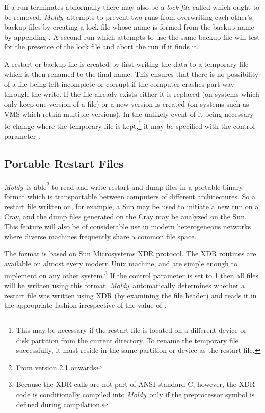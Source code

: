 \documentclass[a4paper,twoside]{report}
\newcommand{\moldy}{\emph{Moldy}}
\begin{document}
If a run terminates abnormally there may also be a \emph{lock file}
called  which ought to be removed.  \moldy\
attempts to prevent two runs from overwriting each other's backup
files by creating a lock file whose name is formed from the backup
name by appending \Fname{.lck}.  A second run which attempts to use the
same backup file will test for the presence of the lock file and abort
the run if it finds it.

A restart or backup file is created by first writing the data to a
temporary file which is then renamed to the final name.  This ensures
that there is no possibility of a file being left incomplete or
corrupt if the computer crashes part-way through the write.  If the
file already exists either it is replaced (on systems which only keep
one version of a file) or a new version is created (on systems such as
VMS which retain multiple versions).  In the unlikely event of it
being necessary to change where the temporary file is
kept,\footnote{This may be necessary if the restart file is located on
  a different device or disk partition from the current directory. To
  rename the temporary file successfully, it must reside in the same
  partition or device as the restart file.} it may be specified with
the control parameter \Lit{temp-file}.

\subsection{Portable Restart Files}
\label{sec:xdr}
\moldy\ is able\footnote{From version 2.1 onwards} to read and write
restart and dump files in a portable binary format which is
transportable between computers of different architectures.  So a
restart file written on, for example, a Sun may be used to initiate a
new run on a Cray, and the dump files generated on the Cray may be
analyzed on the Sun.  This feature will also be of considerable use in
modern heterogeneous networks where diverse machines frequently share
a common file space.

The format is based on Sun Microsystems XDR protocol\cite{sunxdr}.
The XDR routines are available on almost every modern Unix machine,
and are simple enough to implement on any other
system.\footnote{Because the XDR calls are not part of ANSI standard
  C, however, the XDR code is conditionally compiled into \moldy\ only
  if the \Lit{USE\_XDR} preprocessor symbol is defined during
  compilation.} If the control parameter  is set to 1 then
all files will be written using this format. \moldy\ automatically
determines whether a restart file was written using XDR (by examining
the file header) and reads it in the appropriate fashion irrespective
of the value of \Lit{xdr}.
\end{document}
